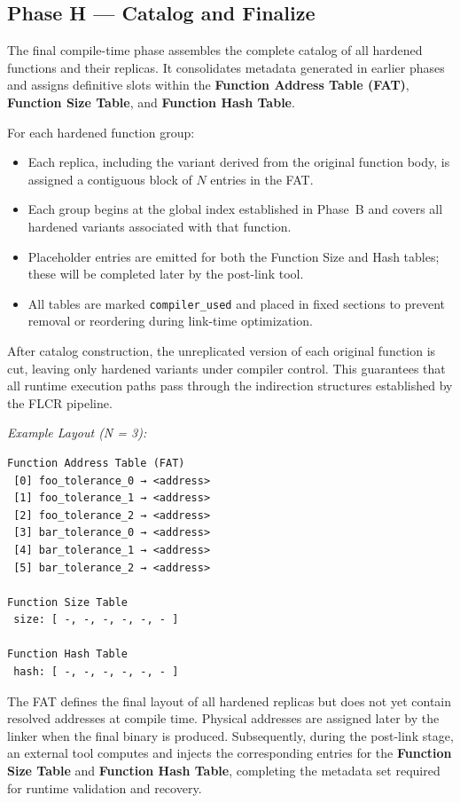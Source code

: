 \subsection*{Phase H — Catalog and Finalize}
The final compile-time phase assembles the complete catalog of all hardened functions
and their replicas. It consolidates metadata generated in earlier phases and assigns
definitive slots within the \textbf{Function Address Table (FAT)},
\textbf{Function Size Table}, and \textbf{Function Hash Table}.

For each hardened function group:
\begin{itemize}
  \item Each replica, including the variant derived from the original function body,
        is assigned a contiguous block of \(N\) entries in the FAT.
  \item Each group begins at the global index established in Phase~B and covers all
        hardened variants associated with that function.
  \item Placeholder entries are emitted for both the Function Size and Hash tables;
        these will be completed later by the post-link tool.
  \item All tables are marked \texttt{compiler\_used} and placed in fixed sections
        to prevent removal or reordering during link-time optimization.
\end{itemize}

After catalog construction, the unreplicated version of each original function is cut,
leaving only hardened variants under compiler control.  
This guarantees that all runtime execution paths pass through the indirection
structures established by the FLCR pipeline.

\begin{center}
\textit{Example Layout (N = 3):}
\end{center}

\begin{verbatim}
Function Address Table (FAT)
 [0] foo_tolerance_0 → <address>
 [1] foo_tolerance_1 → <address>
 [2] foo_tolerance_2 → <address>
 [3] bar_tolerance_0 → <address>
 [4] bar_tolerance_1 → <address>
 [5] bar_tolerance_2 → <address>

Function Size Table
 size: [ -, -, -, -, -, - ]

Function Hash Table
 hash: [ -, -, -, -, -, - ]
\end{verbatim}

The FAT defines the final layout of all hardened replicas but does not yet contain
resolved addresses at compile time.  
Physical addresses are assigned later by the linker when the final binary is produced.  
Subsequently, during the post-link stage, an external tool computes and injects
the corresponding entries for the \textbf{Function Size Table} and
\textbf{Function Hash Table}, completing the metadata set required for runtime
validation and recovery.


